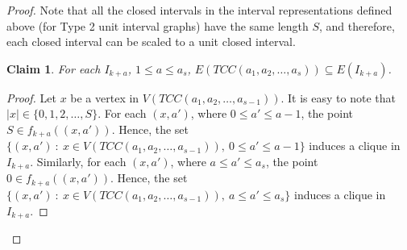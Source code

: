 \documentclass[twoside, 11pt]{article}
\newtheorem{claim}{Claim}
\newcommand{\T}{TCC(a_1,a_2,\dots,a_{s-1})}
\newcommand{\TT}{TCC(a_1,a_2,\dots,a_s)}
\begin{document}
\begin{proof}



Note that all the closed intervals in the interval representations defined above (for Type 2 unit interval graphs) have the same length $S$, and therefore, each closed interval can be scaled to a unit closed interval.




\begin{claim}\label{Type 2 interval graphs are supergraphs}
    For each $I_{k+a}$, $1 \leq a \leq a_s$, $E(\TT) \subseteq E(I_{k+a})$.
\end{claim}
\begin{proof}
    Let $x$ be a vertex in $V(\T)$. It is easy to note that $|x| \in \{0,1,2,\dots,S\}$. For each $(x,a')$, where $0\leq a' \leq a-1$, the point $S \in f_{k+a} ((x,a'))$. Hence, the set $\{(x,a') \ : \ x \in V(\T), \ 0 \leq a' \leq a-1\}$ induces a clique in $I_{k+a}$. Similarly, for each $(x,a')$, where $a\leq a' \leq a_s$, the point $0 \in f_{k+a} ((x,a'))$. Hence, the set $\{(x,a') \ : \ x \in V(\T), \ a \leq a' \leq a_s\}$ induces a clique in $I_{k+a}$.


\end{proof}
\end{proof}
\end{document}
